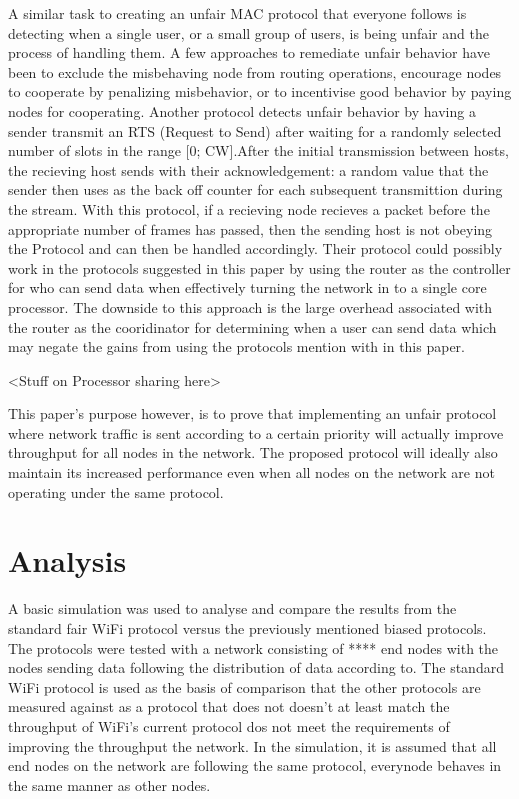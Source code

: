 \documentclass{sigcomm-alternate}
\begin{document}
A similar task to creating an unfair MAC protocol that everyone follows is detecting when a single user, or a small group of users, is being unfair and the process of handling them. A few approaches to remediate unfair behavior have been to exclude the misbehaving node from routing operations, encourage nodes to cooperate by penalizing misbehavior, or to incentivise good behavior by paying nodes for cooperating. Another protocol detects unfair behavior by having a sender transmit an RTS (Request to Send) after waiting for a randomly selected number of slots in the range [0; CW].After the initial transmission between hosts, the recieving host sends with their acknowledgement: a random value that the sender then uses as the back off counter for each subsequent transmittion during the stream. \cite{Kyasanur} With this protocol, if a recieving node recieves a packet before the appropriate number of frames has passed, then the sending host is not obeying the Protocol and can then be handled accordingly. Their protocol could possibly work in the protocols suggested in this paper by using the router as the controller for who can send data when effectively turning the network in to a single core processor. The downside to this approach is the large overhead associated with the router as the cooridinator for determining when a user can send data which may negate the gains from using the protocols mention with in this paper.

<Stuff on Processor sharing here>

This paper's purpose however, is to prove that implementing an unfair protocol where network traffic is sent according to a certain priority will actually improve throughput for all nodes in the network. The proposed protocol will ideally also maintain its increased performance even when all nodes on the network are not operating under the same protocol. 




\section{Analysis}
\label{section:analysis}

A basic simulation was used to analyse and compare the results from the standard fair WiFi protocol versus the previously mentioned biased protocols. The protocols were tested with a network consisting of **** end nodes with the nodes sending data following the distribution of data according to\cite{Douceur}. The standard WiFi protocol is used as the basis of comparison that the other protocols are measured against as a protocol that does not doesn't at least match the throughput of WiFi's current protocol dos not meet the requirements of improving the throughput the network. In the simulation, it is assumed that all end nodes on the network are following the same protocol, everynode behaves in the same manner as other nodes.
\end{document}
